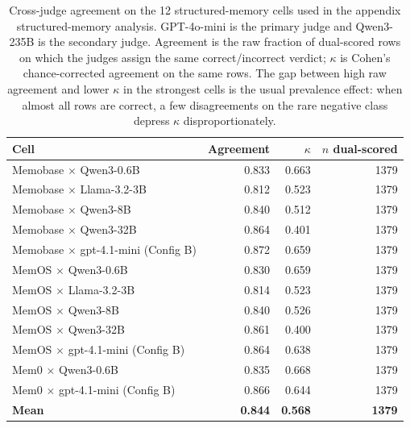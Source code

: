 \begin{table}[h]
\centering
\caption{Cross-judge agreement on the 12 structured-memory cells used in the appendix structured-memory analysis. GPT-4o-mini is the primary judge and Qwen3-235B is the secondary judge. Agreement is the raw fraction of dual-scored rows on which the judges assign the same correct/incorrect verdict; $\kappa$ is Cohen's chance-corrected agreement on the same rows. The gap between high raw agreement and lower $\kappa$ in the strongest cells is the usual prevalence effect: when almost all rows are correct, a few disagreements on the rare negative class depress $\kappa$ disproportionately.}
\label{tab:cross-judge-kappa}
\small
\setlength{\tabcolsep}{6pt}
\begin{tabular}{@{}lrrr@{}}
\toprule
\textbf{Cell} & Agreement & $\kappa$ & $n$ dual-scored \\
\midrule
Memobase $\times$ Qwen3-0.6B & 0.833 & 0.663 & 1379 \\
Memobase $\times$ Llama-3.2-3B & 0.812 & 0.523 & 1379 \\
Memobase $\times$ Qwen3-8B & 0.840 & 0.512 & 1379 \\
Memobase $\times$ Qwen3-32B & 0.864 & 0.401 & 1379 \\
Memobase $\times$ gpt-4.1-mini (Config B) & 0.872 & 0.659 & 1379 \\
\midrule
MemOS $\times$ Qwen3-0.6B & 0.830 & 0.659 & 1379 \\
MemOS $\times$ Llama-3.2-3B & 0.814 & 0.523 & 1379 \\
MemOS $\times$ Qwen3-8B & 0.840 & 0.526 & 1379 \\
MemOS $\times$ Qwen3-32B & 0.861 & 0.400 & 1379 \\
MemOS $\times$ gpt-4.1-mini (Config B) & 0.864 & 0.638 & 1379 \\
\midrule
Mem0 $\times$ Qwen3-0.6B & 0.835 & 0.668 & 1379 \\
Mem0 $\times$ gpt-4.1-mini (Config B) & 0.866 & 0.644 & 1379 \\
\midrule
\textbf{Mean} & \textbf{0.844} & \textbf{0.568} & \textbf{1379} \\
\bottomrule
\end{tabular}
\end{table}
